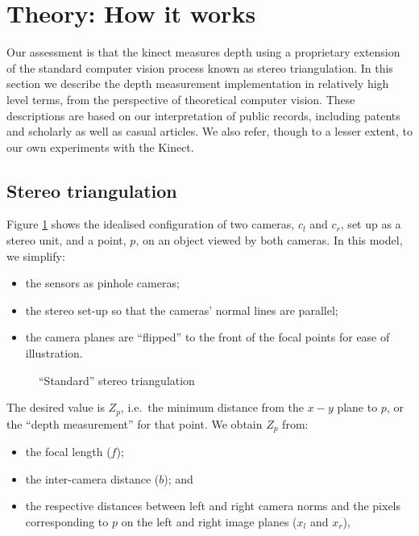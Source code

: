 \section{Theory: How it works}
\label{howitworks}

Our assessment is that the kinect measures depth using a proprietary extension
of the standard computer vision process known as stereo triangulation. In this
section we describe the depth measurement implementation in relatively high
level terms, from the perspective of theoretical computer vision. These
descriptions are based on our interpretation of public records, including
patents and scholarly as well as casual articles. We also refer, though to a
lesser extent, to our own experiments with the Kinect.


\subsection{Stereo triangulation}
\label{sub:triang}

Figure \ref{fig:triang} shows the idealised configuration of two cameras,
$c_{l}$ and $c_{r}$, set up as a stereo unit, and a point, $p$, on an object
viewed by both cameras. In this model, we simplify: 

\begin{itemize}

    \item   the sensors as pinhole cameras;

    \item   the stereo set-up so that the cameras' normal lines are parallel;

    \item   the camera planes are ``flipped'' to the front of the focal points
    for ease of illustration.

\end{itemize}

\begin{figure}[ht]
    \begin{center}
        
        \caption{``Standard'' stereo triangulation}
        \label{fig:triang}
    \end{center}
\end{figure}

The desired value is $Z_{p}$, i.e.\ the minimum distance from the $x-y$ plane to
$p$, or the ``depth measurement'' for that point. We obtain $Z_{p}$ from: 

\begin{itemize}

    \item the focal length ($f$);

    \item the inter-camera distance ($b$); and 

    \item the respective distances between left and right camera norms and the
    pixels corresponding to $p$ on the left and right image planes ($x_{l}$ and
    $x_{r}$),

\end{itemize}

